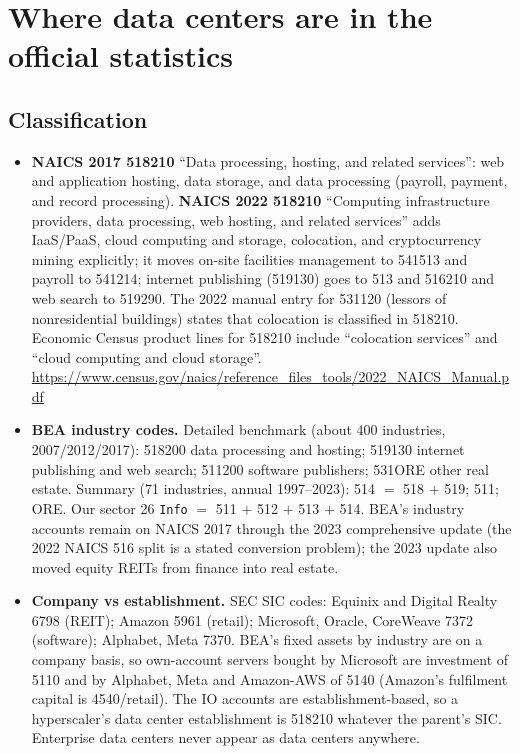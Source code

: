 \documentclass[11pt]{article}
\begin{document}
\section{Where data centers are in the official statistics}\label{sec:where}

\subsection{Classification}
\begin{itemize}
  \item \textbf{NAICS 2017 518210} ``Data processing, hosting, and related services'': web and application hosting, data storage, and data processing (payroll, payment, and record processing). \textbf{NAICS 2022 518210} ``Computing infrastructure providers, data processing, web hosting, and related services'' adds IaaS/PaaS, cloud computing and storage, colocation, and cryptocurrency mining explicitly; it moves on-site facilities management to 541513 and payroll to 541214; internet publishing (519130) goes to 513 and 516210 and web search to 519290. The 2022 manual entry for 531120 (lessors of nonresidential buildings) states that colocation is classified in 518210. Economic Census product lines for 518210 include ``colocation services'' and ``cloud computing and cloud storage''. \url{https://www.census.gov/naics/reference_files_tools/2022_NAICS_Manual.pdf}
  \item \textbf{BEA industry codes.} Detailed benchmark (about 400 industries, 2007/2012/2017): 518200 data processing and hosting; 519130 internet publishing and web search; 511200 software publishers; 531ORE other real estate. Summary (71 industries, annual 1997--2023): 514 $=$ 518 $+$ 519; 511; ORE. Our sector 26 \texttt{Info} $=$ 511 $+$ 512 $+$ 513 $+$ 514. BEA's industry accounts remain on NAICS 2017 through the 2023 comprehensive update (the 2022 NAICS 516 split is a stated conversion problem); the 2023 update also moved equity REITs from finance into real estate.
  \item \textbf{Company vs establishment.} SEC SIC codes: Equinix and Digital Realty 6798 (REIT); Amazon 5961 (retail); Microsoft, Oracle, CoreWeave 7372 (software); Alphabet, Meta 7370. BEA's fixed assets by industry are on a company basis, so own-account servers bought by Microsoft are investment of 5110 and by Alphabet, Meta and Amazon-AWS of 5140 (Amazon's fulfilment capital is 4540/retail). The IO accounts are establishment-based, so a hyperscaler's data center establishment is 518210 whatever the parent's SIC. Enterprise data centers never appear as data centers anywhere.

\end{itemize}
\end{document}
